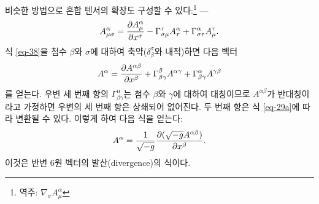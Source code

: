 \documentclass[b5paper]{article}
\begin{document}
비슷한 방법으로 혼합 텐서의 확장도 구성할 수 있다:\footnote{역주: $\nabla_\sigma A_{\mu}^{\alpha}$} ---
\begin{equation} \label{eq-39}
A_{\mu\sigma}^{\alpha}
= {\frac{{\partial}{A_{\mu}^{\alpha}}}{{\partial}{x^\sigma}}}
- \Gamma_{\sigma\mu}^\tau A_{\tau}^{\alpha} 
+ \Gamma_{\sigma\tau}^\alpha A_{\mu}^{\tau}.
\end{equation}
식 \eqref{eq-38}을 첨수 $\beta$와 $\sigma$에 대하여 축약($\delta_\beta^\sigma$와 내적)하면 다음 벡터
\begin{equation*}
A^\alpha = {\frac{{\partial}{A^{\alpha\beta}}}{{\partial}{x^\beta}}}
+ \Gamma_{\beta\gamma}^\beta A^{\alpha\gamma}
+ \Gamma_{\beta\gamma}^\alpha A^{\gamma\beta} 
\end{equation*}
를 얻는다. 우변 세 번째 항의 $\Gamma_{\beta\gamma}^\alpha$는 첨수 $\beta$와 $\gamma$에 대하여 대칭이므로 $A^{\alpha\beta}$가 반대칭이라고 가정하면 우변의 세 번째 항은 상쇄되어 없어진다. 두 번째 항은 식 \eqref{eq-29a}에 따라 변환될 수 있다. 이렇게 하여 다음 식을 얻는다:
\begin{equation} \label{eq-40}
	A^\alpha = \frac{1}{\sqrt{-g}}{\frac{{\partial}{(\sqrt{-g}A^{\alpha\beta})}}{{\partial}{x^\beta}}}.
\end{equation}
이것은 반변 6원 벡터의 발산(divergence)의 식이다.
\end{document}
